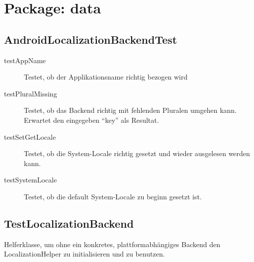 \section{Package: data}
\subsection{AndroidLocalizationBackendTest}
\begin{description}
\item[testAppName]
	Testet, ob der Applikationsname richtig bezogen wird
\item[testPluralMissing]
	Testet, ob das Backend richtig mit fehlenden Pluralen umgehen kann. 
	Erwartet den eingegeben "`key"' als Resultat.
\item[testSetGetLocale]
	Testet, ob die System-Locale richtig gesetzt und wieder ausgelesen werden kann.
\item[testSystemLocale]
	Testet, ob die default System-Locale zu beginn gesetzt ist.
\end{description}

\subsection{TestLocalizationBackend}
Helferklasse, um ohne ein konkretes, plattformabhängiges Backend den LocalizationHelper zu initialisieren und zu benutzen.
